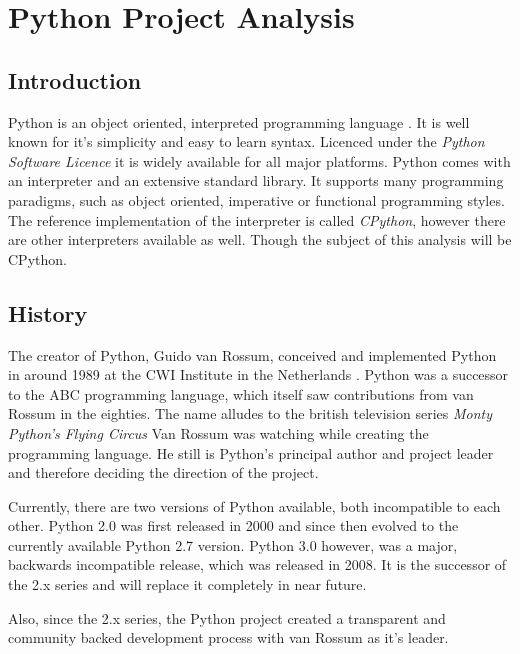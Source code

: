 \section{Python Project Analysis} %
\label{sec:Python Project Analysis}


\subsection{Introduction} %
\label{sub:Introduction}

Python is an object oriented, interpreted programming language
\cite{PythonAbout}. It is well known for it's simplicity and easy to learn
syntax. Licenced under the \emph{Python Software Licence} \cite{PythonLicence}
it is widely available for all major platforms. Python comes with an
interpreter and an extensive standard library. It supports many programming
paradigms, such as object oriented, imperative or functional programming
styles. The reference implementation of the interpreter is called
\emph{CPython}, however there are other interpreters available as well. Though
the subject of this analysis will be CPython.


\subsection{History} %
\label{sub:History}

The creator of Python, Guido van Rossum, conceived and implemented Python in
around 1989 at the CWI Institute in the Netherlands \cite{Venners2003}. Python
was a successor to the ABC programming language, which itself saw contributions
from van Rossum in the eighties. The name alludes to the british television
series \emph{Monty Python's Flying Circus} Van Rossum was watching while
creating the programming language. He still is Python's principal author and
project leader and therefore deciding the direction of the project.

Currently, there are two versions of Python available, both incompatible to
each other. Python 2.0 was first released in 2000 and since then evolved to the
currently available Python 2.7 version. Python 3.0 however, was a major,
backwards incompatible release, which was released in 2008. It is the successor
of the 2.x series and will replace it completely in near future.

Also, since the 2.x series, the Python project created a transparent and
community backed development process with van Rossum as it's leader.

